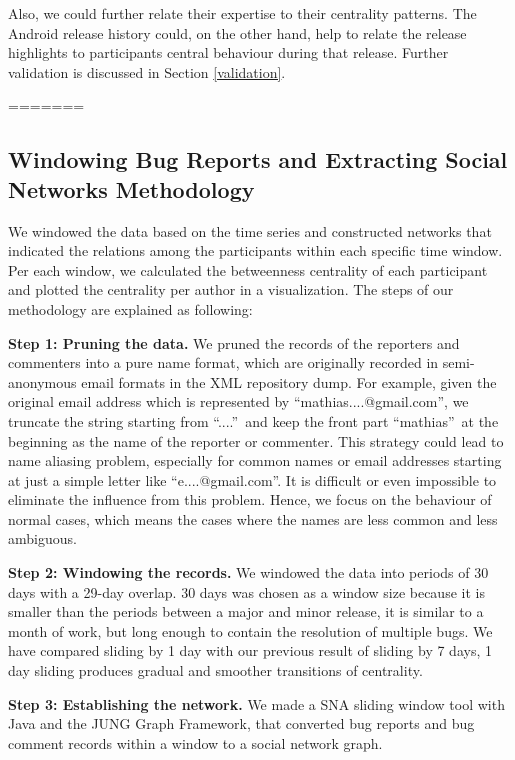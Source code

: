 \documentclass[conference]{IEEEtran}
\begin{document}
Also, we could further relate their expertise to their centrality
patterns. The Android release history could, on the other hand, help
to relate the release highlights to participants central behaviour during
that release. Further validation is discussed in Section
\ref{validation}. 


=======
\subsection{Windowing Bug Reports and Extracting Social Networks Methodology}
We windowed the data based on the time series and constructed networks
that indicated the relations among the participants within each specific
time window. Per each window, we calculated the betweenness centrality of each
participant and plotted the centrality per author in a visualization. The steps of our methodology are
explained as following:


\textbf{Step 1: Pruning the data.} We pruned the records of the
reporters and commenters into a pure name format, which are originally
recorded in semi-anonymous email formats in the XML repository dump. 
For example, given the original email address which is represented by
\textquotedblleft mathias....@gmail.com\textquotedblright, we truncate
the string starting from \textquotedblleft ....\textquotedblright \
and keep the front part \textquotedblleft mathias\textquotedblright \
at the beginning as the name of the reporter or commenter. 
This strategy could lead to name aliasing problem, especially for
common names or email addresses starting at just a simple letter like
\textquotedblleft e....@gmail.com\textquotedblright.
 It is difficult or even impossible to eliminate the influence from
 this problem. Hence, we focus on the behaviour of normal cases, which
 means the cases where the names are less common and less ambiguous.


\textbf{Step 2: Windowing the records.} We windowed the data into
periods of 30 days with a 29-day overlap. 
30 days was chosen as a window size because it is smaller than the
periods between a major and minor release, it is similar to a month of
work, but long enough to contain the resolution of multiple bugs.
We have compared sliding by 1 day with our previous result of sliding by 7
days, 1 day sliding produces gradual and smoother transitions of
centrality.


\textbf{Step 3: Establishing the network.} We made a SNA sliding
window tool with Java and the JUNG Graph Framework, that converted bug
reports and bug comment records within a window to a social network graph.
\end{document}
